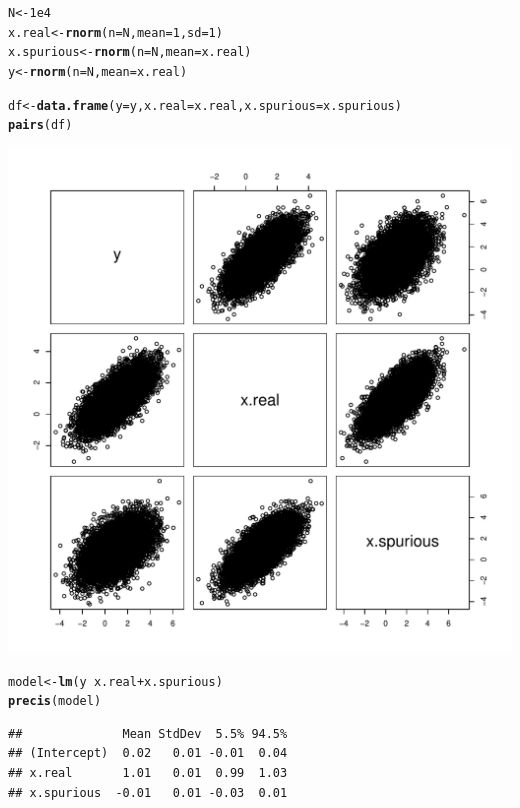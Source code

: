 \documentclass[12pt]{article}\usepackage[]{graphicx}\usepackage[]{color}
\makeatletter
\def\maxwidth{ %
  \ifdim\Gin@nat@width>\linewidth
    \linewidth
  \else
    \Gin@nat@width
  \fi
}
\newcommand{\hlnum}[1]{\textcolor[rgb]{0.686,0.059,0.569}{#1}}%
\newcommand{\hlopt}[1]{\textcolor[rgb]{0,0,0}{#1}}%
\newcommand{\hlstd}[1]{\textcolor[rgb]{0.345,0.345,0.345}{#1}}%
\newcommand{\hlkwb}[1]{\textcolor[rgb]{0.69,0.353,0.396}{#1}}%
\newcommand{\hlkwc}[1]{\textcolor[rgb]{0.333,0.667,0.333}{#1}}%
\newcommand{\hlkwd}[1]{\textcolor[rgb]{0.737,0.353,0.396}{\textbf{#1}}}%
\newenvironment{kframe}{%
 \def\at@end@of@kframe{}%
 \ifinner\ifhmode%
  \def\at@end@of@kframe{\end{minipage}}%
  \begin{minipage}{\columnwidth}%
 \fi\fi%
 \def\FrameCommand##1{\hskip\@totalleftmargin \hskip-\fboxsep
 \colorbox{shadecolor}{##1}\hskip-\fboxsep
     \hskip-\linewidth \hskip-\@totalleftmargin \hskip\columnwidth}%
 \MakeFramed {\advance\hsize-\width
   \@totalleftmargin\z@ \linewidth\hsize
   \@setminipage}}%
 {\par\unskip\endMakeFramed%
 \at@end@of@kframe}
\newenvironment{knitrout}{}{} %
\makeatother
\begin{document}
\begin{knitrout}
\color{fgcolor}\begin{kframe}
\begin{alltt}
\hlstd{N} \hlkwb{<-} \hlnum{1e4}
\hlstd{x.real} \hlkwb{<-} \hlkwd{rnorm}\hlstd{(}\hlkwc{n} \hlstd{= N,} \hlkwc{mean} \hlstd{=} \hlnum{1}\hlstd{,} \hlkwc{sd} \hlstd{=} \hlnum{1}\hlstd{)}
\hlstd{x.spurious} \hlkwb{<-} \hlkwd{rnorm}\hlstd{(}\hlkwc{n} \hlstd{= N,} \hlkwc{mean} \hlstd{= x.real)}
\hlstd{y} \hlkwb{<-} \hlkwd{rnorm}\hlstd{(}\hlkwc{n} \hlstd{= N,} \hlkwc{mean} \hlstd{= x.real)}

\hlstd{df} \hlkwb{<-} \hlkwd{data.frame}\hlstd{(}\hlkwc{y} \hlstd{= y,} \hlkwc{x.real} \hlstd{= x.real,} \hlkwc{x.spurious} \hlstd{= x.spurious)}
\hlkwd{pairs}\hlstd{(df)}
\end{alltt}
\end{kframe}
\includegraphics[width=\maxwidth]{figure/unnamed-chunk-2-1} 
\begin{kframe}\begin{alltt}
\hlstd{model} \hlkwb{<-} \hlkwd{lm}\hlstd{(y} \hlopt{~} \hlstd{x.real} \hlopt{+} \hlstd{x.spurious)}
\hlkwd{precis}\hlstd{(model)}
\end{alltt}
\begin{verbatim}
##              Mean StdDev  5.5% 94.5%
## (Intercept)  0.02   0.01 -0.01  0.04
## x.real       1.01   0.01  0.99  1.03
## x.spurious  -0.01   0.01 -0.03  0.01
\end{verbatim}
\end{kframe}
\end{knitrout}
\end{document}
